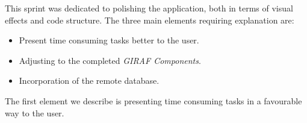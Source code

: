 This sprint was dedicated to polishing the application, both in terms of visual effects and code structure.
The three main elements requiring explanation are:

\begin{itemize}
\item Present time consuming tasks better to the user.
\item Adjusting \launcher to the completed \textit{GIRAF Components}.
\item Incorporation of the remote database.
\end{itemize}

The first element we describe is presenting time consuming tasks in a favourable way to the user.